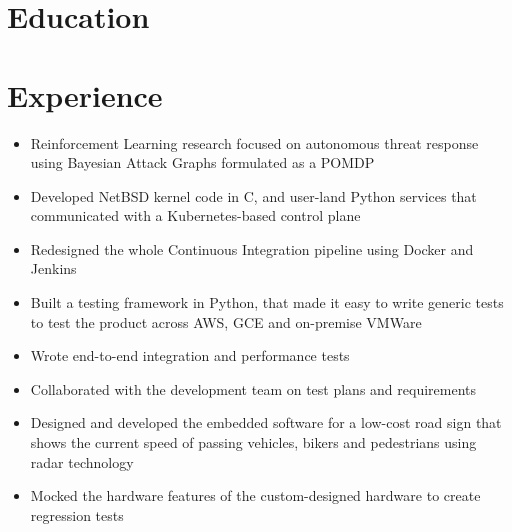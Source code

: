 \documentclass{cv_doc}
\begin{document}
\vspace{0.8cm}

\section*{Education}


\section*{Experience}


\begin{itemize}[label={\tiny\raisebox{1ex}{\textbullet}}]
  \item {Reinforcement Learning research focused on autonomous threat response using Bayesian Attack Graphs formulated as a POMDP}
  \item {Developed NetBSD kernel code in C, and user-land Python services that
  communicated with a Kubernetes-based control plane}
\end{itemize}


\begin{itemize}[label={\tiny\raisebox{1ex}{\textbullet}}]
  \item {Redesigned the whole Continuous Integration pipeline using Docker and
  Jenkins}
  \item {Built a testing framework in Python, that made it easy to write
  generic tests to test the product across AWS, GCE and on-premise VMWare}
  \item {Wrote end-to-end integration and performance tests}
  \item {Collaborated with the development team on test plans and requirements}
\end{itemize}


\begin{itemize}[label={\tiny\raisebox{1ex}{\textbullet}}]
  \item {Designed and developed the embedded software for a low-cost road sign
  that shows the current speed of passing vehicles, bikers and pedestrians
  using radar technology}
  \item {Mocked the hardware features of the custom-designed hardware to create
  regression tests}
\end{itemize}
\end{document}
